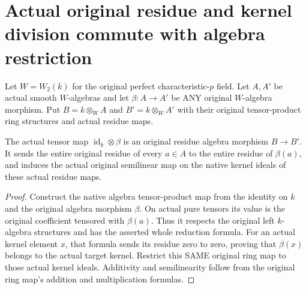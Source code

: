 \section{Actual original residue and kernel division commute with algebra restriction}
\label{sec:witt-two-algebra-division-naturality}

Let $W=W_2(k)$ for the original perfect characteristic-$p$ field.
Let $A,A'$ be actual smooth $W$-algebras and let
$\beta:A\to A'$ be ANY original $W$-algebra morphism. Put
$B=k\otimes_W A$ and $B'=k\otimes_W A'$ with their original
tensor-product ring structures and actual residue maps.

\begin{definition}
\label{def:witt-two-actual-residue-kernel-maps}
\leanok
{}
The actual tensor map $\operatorname{id}_k\otimes\beta$ is an
original residue algebra morphism $B\to B'$. It sends the entire
original residue of every $a\in A$ to the entire residue of
$\beta(a)$, and induces the actual original semilinear map on
the native kernel ideals of these actual residue maps.
\end{definition}
\begin{proof}
Construct the native algebra tensor-product map from the identity
on $k$ and the original algebra morphism $\beta$. On actual
pure tensors its value is the original coefficient tensored with
$\beta(a)$. Thus it respects the original left $k$-algebra
structures and has the asserted whole reduction formula. For an
actual kernel element $x$, that formula sends its residue zero
to zero, proving that $\beta(x)$ belongs to the actual target
kernel. Restrict this SAME original ring map to those actual
kernel ideals. Additivity and semilinearity follow from the
original ring map's addition and multiplication formulas.
\end{proof}

